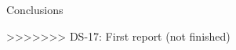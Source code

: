 \documentclass[9pt]{extarticle}
\begin{document}
    \begin{section}{Conclusions}

>>>>>>> DS-17: First report (not finished)
    \end{section}
\end{document}
